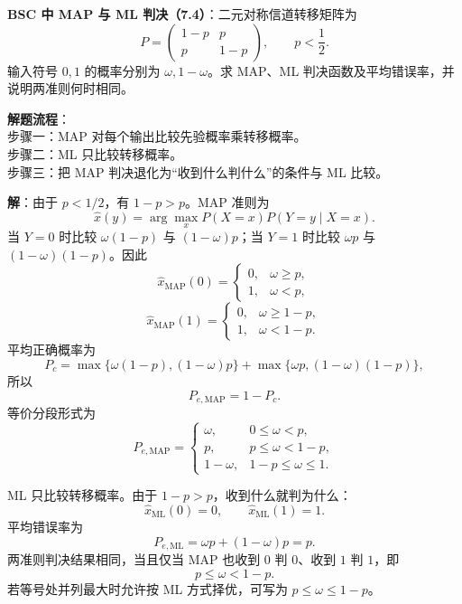 \begin{example}
\label{hw:ch7-4-bsc-map-ml-decision}
\textbf{BSC 中 MAP 与 ML 判决（7.4）}：二元对称信道转移矩阵为
\[
P=
\begin{pmatrix}
1-p&p\\
p&1-p
\end{pmatrix},
\qquad p<\frac12.
\]
输入符号 $0,1$ 的概率分别为 $\omega,1-\omega$。求 MAP、ML 判决函数及平均错误率，并说明两准则何时相同。

\noindent \textbf{解题流程}：\\[2pt]
步骤一：MAP 对每个输出比较先验概率乘转移概率。\\
步骤二：ML 只比较转移概率。\\
步骤三：把 MAP 判决退化为“收到什么判什么”的条件与 ML 比较。

\textbf{解}：由于 $p<1/2$，有 $1-p>p$。MAP 准则为
\[
\hat x(y)=\arg\max_x P(X=x)P(Y=y\mid X=x).
\]
当 $Y=0$ 时比较 $\omega(1-p)$ 与 $(1-\omega)p$；当 $Y=1$ 时比较 $\omega p$ 与 $(1-\omega)(1-p)$。因此
\[
\hat x_{\mathrm{MAP}}(0)=
\begin{cases}
0,&\omega\ge p,\\
1,&\omega<p,
\end{cases}
\]
\[
\hat x_{\mathrm{MAP}}(1)=
\begin{cases}
0,&\omega\ge1-p,\\
1,&\omega<1-p.
\end{cases}
\]
平均正确概率为
\[
P_c=\max\{\omega(1-p),(1-\omega)p\}
+\max\{\omega p,(1-\omega)(1-p)\},
\]
所以
\[
P_{e,\mathrm{MAP}}=1-P_c.
\]
等价分段形式为
\[
P_{e,\mathrm{MAP}}=
\begin{cases}
\omega,&0\le\omega<p,\\
p,&p\le\omega<1-p,\\
1-\omega,&1-p\le\omega\le1.
\end{cases}
\]

ML 只比较转移概率。由于 $1-p>p$，收到什么就判为什么：
\[
\hat x_{\mathrm{ML}}(0)=0,
\qquad
\hat x_{\mathrm{ML}}(1)=1.
\]
平均错误率为
\[
P_{e,\mathrm{ML}}=\omega p+(1-\omega)p=p.
\]
两准则判决结果相同，当且仅当 MAP 也收到 $0$ 判 $0$、收到 $1$ 判 $1$，即
\[
p\le\omega<1-p.
\]
若等号处并列最大时允许按 ML 方式择优，可写为 $p\le\omega\le1-p$。
\end{example}

